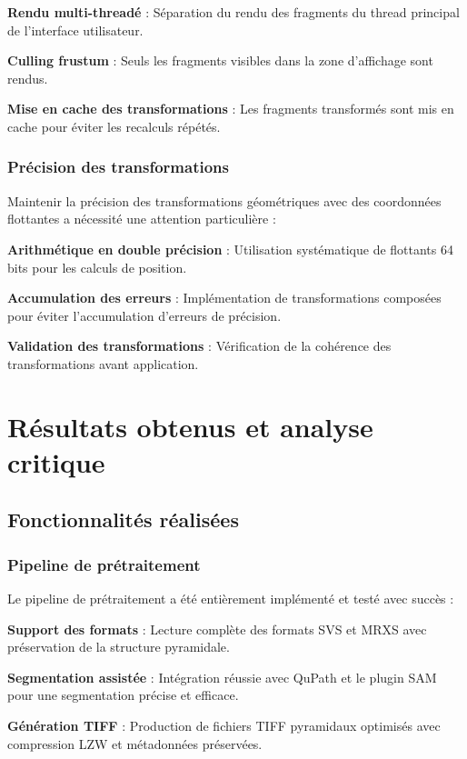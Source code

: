 \documentclass[12pt,a4paper]{report}
\begin{document}
\textbf{Rendu multi-threadé} : Séparation du rendu des fragments du thread principal de l'interface utilisateur.

\textbf{Culling frustum} : Seuls les fragments visibles dans la zone d'affichage sont rendus.

\textbf{Mise en cache des transformations} : Les fragments transformés sont mis en cache pour éviter les recalculs répétés.

\subsubsection{Précision des transformations}

Maintenir la précision des transformations géométriques avec des coordonnées flottantes a nécessité une attention particulière :

\textbf{Arithmétique en double précision} : Utilisation systématique de flottants 64 bits pour les calculs de position.

\textbf{Accumulation des erreurs} : Implémentation de transformations composées pour éviter l'accumulation d'erreurs de précision.

\textbf{Validation des transformations} : Vérification de la cohérence des transformations avant application.

\section{Résultats obtenus et analyse critique}

\subsection{Fonctionnalités réalisées}

\subsubsection{Pipeline de prétraitement}

Le pipeline de prétraitement a été entièrement implémenté et testé avec succès :

\textbf{Support des formats} : Lecture complète des formats SVS et MRXS avec préservation de la structure pyramidale.

\textbf{Segmentation assistée} : Intégration réussie avec QuPath et le plugin SAM pour une segmentation précise et efficace.

\textbf{Génération TIFF} : Production de fichiers TIFF pyramidaux optimisés avec compression LZW et métadonnées préservées.
\end{document}
